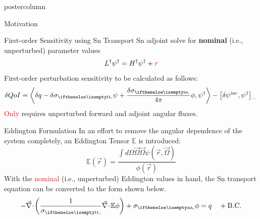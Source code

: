 \documentclass[xcolor={usenames,dvipsnames,svgnames,table}]{beamer}
\newcommand{\vr}{\vec{r}}
\newcommand{\vO}{\vec{\Omega}}
\newcommand{\bra}{\left\langle}
\newcommand{\ket}{\right\rangle}
\newcommand{\sbra}{\left[}
\newcommand{\sket}{\right]}
\newcommand{\bound}{\partial V}
\newcommand{\vn}{\vec{n}}
\newcommand{\Edd}{\mathbb{E}}
\newcommand{\BEdd}{B}
\newcommand{\scalSource}{q}
\newcommand{\angResp}{q^\dag}
\newcommand{\tcr}[1]{\textcolor{red}{#1}}
\begin{document}
\begin{frame}
\begin{columns}
\begin{column}{.33\textwidth}
\begin{beamercolorbox}[center,wd=\textwidth]{postercolumn}
\begin{minipage}[T]{0.95\textwidth}
{\begin{block}{Motivation}
			    \end{block}
			    \vfill


			    \begin{block}{First-order Sensitivity using Sn Transport}
Sn adjoint solve for {\bf nominal} (i.e., unperturbed) parameter values 			    
\begin{equation}
\label{snAdj}
L^\dag \psi^\dag = H^\dag \psi^\dag + \tcr{r}
\end{equation}
First-order perturbation sensitivity to be calculated as follows:
\begin{equation}
\label{snSens}
\delta QoI = \bra \delta \scalSource - \delta \sigt \psi + \frac{\delta\sigs}{4 \pi} \phi , \psi^\dag  \ket - \sbra \delta \psi^{\text{inc}}, \psi^\dag \sket_- \,
\end{equation}
\tcr{Only} requires unperturbed forward and adjoint angular fluxes.
			    \end{block}
			    \vfill




\begin{block}{Eddington Formulation}
In an effort to remove the angular dependence of the system completely, an Eddington Tensor $\Edd$ is introduced:
\begin{equation}
\label{EddDef}
\Edd(\vr)=\frac{\int d\Omega \vO \vO \psi(\vr,\vO)}{\phi(\vr)}
\end{equation}
With the \tcr{nominal} (i.e., unperturbed) Eddington values in hand, the Sn transport equation can be converted to the form shown below. 
\begin{equation}
\label{VEFForm}
- \div \left( \frac{1}{\sigt}\div \Edd \phi \right) + \siga \phi = \scalSource \quad + \text{B.C.} %
\end{equation}


\end{block}}
\end{minipage}
\end{beamercolorbox}
\end{column}
\end{columns}
\end{frame}
\end{document}
